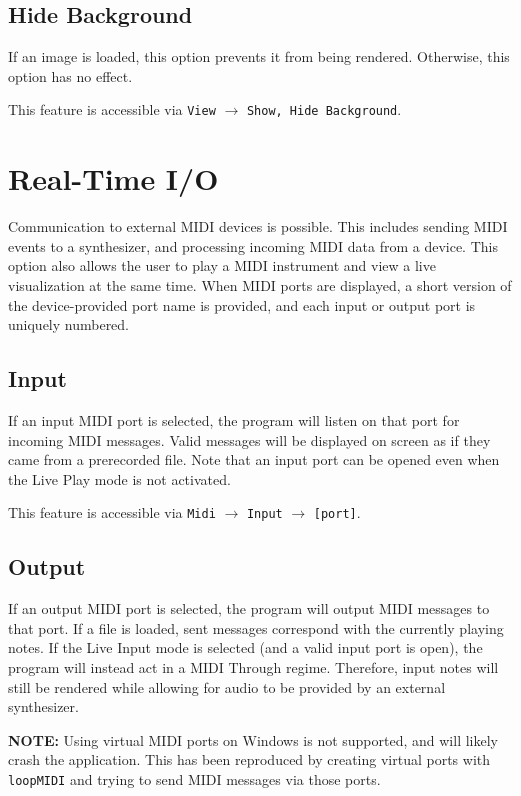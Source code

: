 \documentclass[english]{article}
\providecommand{\mi}[1]{\texttt{#1}}
\begin{document}
\subsection{Hide Background}

If an image is loaded, this option prevents it from being rendered. Otherwise, this option has no effect.

This feature is accessible via 
\mi{View} $\rightarrow$ \mi{{Show, Hide} Background}.

\section{Real-Time I/O}

Communication to external MIDI devices is possible. This includes sending MIDI events to a synthesizer,
and processing incoming MIDI data from a device. This option also allows the user to play a MIDI instrument and
view a live visualization at the same time. When MIDI ports are displayed, a short version of the device-provided
port name is provided, and each input or output port is uniquely numbered.

\subsection{Input}

If an input MIDI port is selected, the program will listen on that port for incoming MIDI messages. Valid messages will
be displayed on screen as if they came from a prerecorded file. Note that an input port can be opened even when the
Live Play mode is not activated.

This feature is accessible via 
\mi{Midi} $\rightarrow$ \mi{Input} $\rightarrow$ \mi{[port]}.

\subsection{Output}
\label{subsec:output}

If an output MIDI port is selected, the program will output MIDI messages to that port. If a file is loaded, sent messages
correspond with the currently playing notes. If the Live Input mode is selected (and a valid input port is open), the program
will instead act in a MIDI Through regime. Therefore, input notes will still 
be rendered while allowing for audio to be provided by an external synthesizer.

\textbf{NOTE:} Using virtual MIDI ports on Windows is not supported, and will likely crash the application. This has been
reproduced by creating virtual ports with \mi{loopMIDI} and trying to send MIDI messages via those ports.
\end{document}
